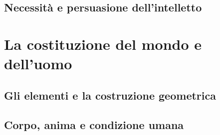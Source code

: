 \subsection{Necessità e persuasione dell'intelletto}

\section{La costituzione del mondo e dell'uomo}

\subsection{Gli elementi e la costruzione geometrica}

\subsection{Corpo, anima e condizione umana}
